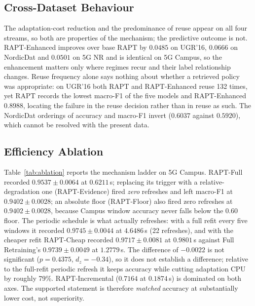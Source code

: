 \documentclass[conference]{IEEEtran}
\begin{document}
\subsection{Cross-Dataset Behaviour}
The adaptation-cost reduction and the predominance of reuse appear on all four
streams, so both are properties of the mechanism; the predictive outcome is not.
RAPT-Enhanced improves over base RAPT by $0.0485$ on UGR'16, $0.0666$ on NordicDat
and $0.0501$ on 5G NR and is identical on 5G Campus, so the enhancement matters only
where regimes recur and their label relationship changes. Reuse frequency alone says
nothing about whether a retrieved policy was appropriate: on UGR'16 both RAPT and
RAPT-Enhanced reuse 132 times, yet RAPT records the lowest macro-F1 of the five models
and RAPT-Enhanced $0.8988$, locating the failure in the reuse decision rather than in
reuse as such. The NordicDat orderings of accuracy and macro-F1 invert ($0.6037$
against $0.5920$), which cannot be resolved with the present data.

\subsection{Efficiency Ablation}
\label{sec:ablation}
Table~\ref{tab:ablation} reports the mechanism ladder on 5G Campus. RAPT-Full
recorded $0.9537 \pm 0.0064$ at $0.6211$\,s; replacing its trigger with a
relative-degradation one (RAPT-Evidence) fired \emph{zero} refreshes and left
macro-F1 at $0.9402 \pm 0.0028$; an absolute floor (RAPT-Floor) also fired zero
refreshes at $0.9402 \pm 0.0028$, because Campus window accuracy never falls below
the $0.60$ floor. The periodic schedule is what actually refreshes: with a full refit
every five windows it recorded $0.9745 \pm 0.0044$ at $4.6486$\,s (22 refreshes), and
with the cheaper refit RAPT-Cheap recorded $0.9717 \pm 0.0081$ at $0.9801$\,s against
Full Retraining's $0.9739 \pm 0.0049$ at $1.2779$\,s. The difference of $-0.0022$ is
not significant ($p = 0.4375$, $d_z = -0.34$), so it does not establish a
difference; relative to the full-refit periodic refresh it keeps accuracy while
cutting adaptation CPU by roughly 79\%. RAPT-Incremental ($0.7164$ at $0.1874$\,s) is
dominated on both axes. The supported statement is therefore \emph{matched} accuracy
at substantially lower cost, not superiority.
\end{document}
